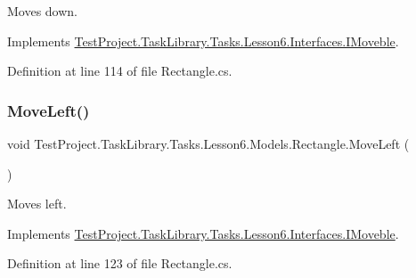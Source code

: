 Moves down. 



Implements \mbox{\hyperlink{interface_test_project_1_1_task_library_1_1_tasks_1_1_lesson6_1_1_interfaces_1_1_i_moveble_a23443cd54657cc981a48ef7f9904185d}{Test\+Project.\+Task\+Library.\+Tasks.\+Lesson6.\+Interfaces.\+I\+Moveble}}.



Definition at line 114 of file Rectangle.\+cs.

\mbox{\label{class_test_project_1_1_task_library_1_1_tasks_1_1_lesson6_1_1_models_1_1_rectangle_adf5fbf63db1eaf0959ef5e6c9dbdedb2}} 
\subsubsection{\texorpdfstring{MoveLeft()}{MoveLeft()}}
{\footnotesize\ttfamily void Test\+Project.\+Task\+Library.\+Tasks.\+Lesson6.\+Models.\+Rectangle.\+Move\+Left (\begin{DoxyParamCaption}{ }\end{DoxyParamCaption})}



Moves left. 



Implements \mbox{\hyperlink{interface_test_project_1_1_task_library_1_1_tasks_1_1_lesson6_1_1_interfaces_1_1_i_moveble_a277cd113ed9b4f35228f1c84bb17e91e}{Test\+Project.\+Task\+Library.\+Tasks.\+Lesson6.\+Interfaces.\+I\+Moveble}}.



Definition at line 123 of file Rectangle.\+cs.

\mbox{\label{class_test_project_1_1_task_library_1_1_tasks_1_1_lesson6_1_1_models_1_1_rectangle_a794f5d29886b4dd004db176c553d5597}} 
